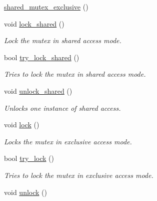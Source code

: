 \begin{DoxyCompactItemize}
\item 
\hyperlink{classcpen333_1_1thread_1_1impl_1_1shared__mutex__exclusive_a8eb9b361f1c0fc4533ca9283c376a2ae}{shared\+\_\+mutex\+\_\+exclusive} ()
\item 
void \hyperlink{classcpen333_1_1thread_1_1impl_1_1shared__mutex__exclusive_ae934ab0e0518a0c0d4a220701f091073}{lock\+\_\+shared} ()
\begin{DoxyCompactList}\small\item\em Lock the mutex in shared access mode. \end{DoxyCompactList}\item 
bool \hyperlink{classcpen333_1_1thread_1_1impl_1_1shared__mutex__exclusive_ae1ca68cd6c5b0f5b14dde5ef52fe126a}{try\+\_\+lock\+\_\+shared} ()
\begin{DoxyCompactList}\small\item\em Tries to lock the mutex in shared access mode. \end{DoxyCompactList}\item 
void \hyperlink{classcpen333_1_1thread_1_1impl_1_1shared__mutex__exclusive_ab80e738628379fd1884aed75cf2b9081}{unlock\+\_\+shared} ()
\begin{DoxyCompactList}\small\item\em Unlocks one instance of shared access. \end{DoxyCompactList}\item 
void \hyperlink{classcpen333_1_1thread_1_1impl_1_1shared__mutex__exclusive_aba3fc22e9d8ecd0de29a267443f66aad}{lock} ()
\begin{DoxyCompactList}\small\item\em Locks the mutex in exclusive access mode. \end{DoxyCompactList}\item 
bool \hyperlink{classcpen333_1_1thread_1_1impl_1_1shared__mutex__exclusive_ae01b118cd23231f529f8666a3283380c}{try\+\_\+lock} ()
\begin{DoxyCompactList}\small\item\em Tries to lock the mutex in exclusive access mode. \end{DoxyCompactList}\item 
\mbox{\label{classcpen333_1_1thread_1_1impl_1_1shared__mutex__exclusive_aab3af6089fa19f79e98400f7681580c5}} 
void \hyperlink{classcpen333_1_1thread_1_1impl_1_1shared__mutex__exclusive_aab3af6089fa19f79e98400f7681580c5}{unlock} ()

\end{DoxyCompactItemize}
